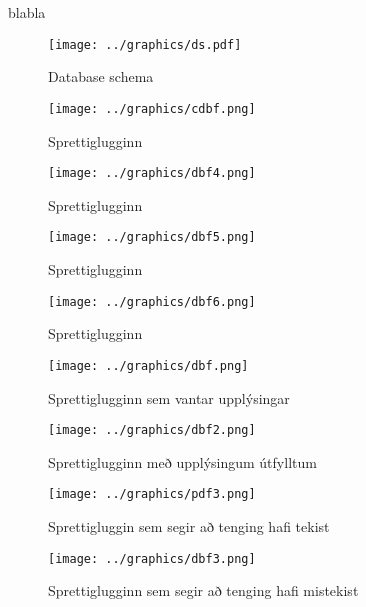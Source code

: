\documentclass[12pt, git, final]{rureport}
\begin{document}
blabla

\pagebreak
\begin{figure}
	\centering 
	\texttt{[image: ../graphics/ds.pdf]}
	\caption{Database schema \label{fig:dataschema}}
\end{figure}

\begin{figure}
	\centering 
	\texttt{[image: ../graphics/cdbf.png]}
	\caption{Sprettiglugginn \label{fig:cdbf}}
\end{figure}

\begin{figure}
	\centering 
	\texttt{[image: ../graphics/dbf4.png]}
	\caption{Sprettiglugginn \label{fig:dbf4}}
\end{figure}

\begin{figure}
	\centering 
	\texttt{[image: ../graphics/dbf5.png]}
	\caption{Sprettiglugginn \label{fig:dbf5}}
\end{figure}

\begin{figure}
	\centering 
	\texttt{[image: ../graphics/dbf6.png]}
	\caption{Sprettiglugginn\label{fig:dbf6}}
\end{figure}

\begin{figure}
	\centering 
	\texttt{[image: ../graphics/dbf.png]}
	\caption{Sprettiglugginn sem vantar upplýsingar  \label{fig:dbf}}
\end{figure}

\begin{figure}
	\centering 
	\texttt{[image: ../graphics/dbf2.png]}
	\caption{Sprettiglugginn með upplýsingum útfylltum \label{fig:dbf2}}
\end{figure}

\begin{figure}
	\centering 
	\texttt{[image: ../graphics/pdf3.png]}
	\caption{Sprettigluggin sem segir að tenging hafi tekist \label{fig:pdf3}}
\end{figure}

\begin{figure}
	\centering 
	\texttt{[image: ../graphics/dbf3.png]}
	\caption{Sprettiglugginn sem segir að tenging hafi mistekist \label{fig:dbf3}}
\end{figure}



\clearpage
\printbibliography
\end{document}
